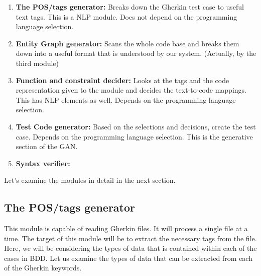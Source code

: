 \documentclass[conference]{IEEEtran}
\begin{document}
\begin{enumerate}
	\item \textbf{The POS/tags generator:}
	Breaks down the Gherkin test case to useful text tags. This is a NLP module. Does not depend on the programming language selection.
	\item \textbf{Entity Graph generator:}
	Scans the whole code base and breaks them down into a useful format that is understood by our system. (Actually, by the third module)
	\item \textbf{Function and constraint decider:}
	Looks at the tags and the code representation given to the module and decides the text-to-code mappings. This has NLP elements as well. Depends on the programming language selection.
	\item \textbf{Test Code generator:}
	Based on the selections and decisions, create the test case. Depends on the programming language selection. This is the generative section of the GAN.
	\item \textbf{Syntax verifier:}
	
\end{enumerate}

Let's examine the modules in detail in the next section.

\subsection{The POS/tags generator}
This module is capable of reading Gherkin files. It will process a single file at a time. The target of this module will be to extract the necessary tags from the file. Here, we will be considering the types of data that is contained within each of the cases in BDD. Let us examine the types of data that can be extracted from each of the Gherkin keywords.
\end{document}
